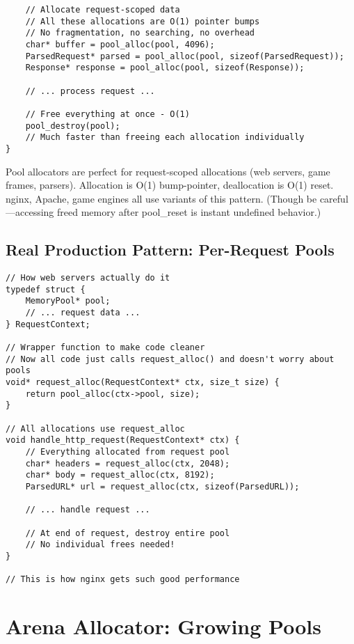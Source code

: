 \begin{lstlisting}
    // Allocate request-scoped data
    // All these allocations are O(1) pointer bumps
    // No fragmentation, no searching, no overhead
    char* buffer = pool_alloc(pool, 4096);
    ParsedRequest* parsed = pool_alloc(pool, sizeof(ParsedRequest));
    Response* response = pool_alloc(pool, sizeof(Response));

    // ... process request ...

    // Free everything at once - O(1)
    pool_destroy(pool);
    // Much faster than freeing each allocation individually
}
\end{lstlisting}

\begin{tipbox}
Pool allocators are perfect for request-scoped allocations (web servers, game frames, parsers). Allocation is O(1) bump-pointer, deallocation is O(1) reset. nginx, Apache, game engines all use variants of this pattern. (Though be careful---accessing freed memory after pool\_reset is instant undefined behavior.)
\end{tipbox}

\subsection{Real Production Pattern: Per-Request Pools}

\begin{lstlisting}
// How web servers actually do it
typedef struct {
    MemoryPool* pool;
    // ... request data ...
} RequestContext;

// Wrapper function to make code cleaner
// Now all code just calls request_alloc() and doesn't worry about pools
void* request_alloc(RequestContext* ctx, size_t size) {
    return pool_alloc(ctx->pool, size);
}

// All allocations use request_alloc
void handle_http_request(RequestContext* ctx) {
    // Everything allocated from request pool
    char* headers = request_alloc(ctx, 2048);
    char* body = request_alloc(ctx, 8192);
    ParsedURL* url = request_alloc(ctx, sizeof(ParsedURL));

    // ... handle request ...

    // At end of request, destroy entire pool
    // No individual frees needed!
}

// This is how nginx gets such good performance
\end{lstlisting}

\section{Arena Allocator: Growing Pools}

